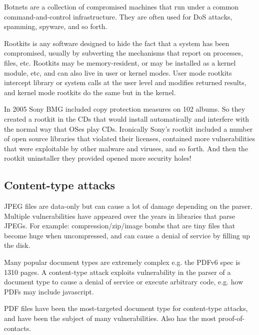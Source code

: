 \documentclass[../notes.tex]{subfiles}
\begin{document}
\begin{definition}
Botnets are a collection of compromised machines that run under a common command-and-control infrastructure.
 They are often used for DoS attacks, spamming, spyware, and so forth.
\end{definition}



\begin{definition}
    Rootkits is any software designed to hide the fact that a system has been compromised, usually by subverting the mechanisms that report on processes, files, etc.
    Rootkits may be memory-resident, or may be installed as a kernel module, etc, and can also live in user or kernel modes.
    User mode rootkits intercept library or system calls at the user level and modifies returned results, and kernel mode rootkits do the same but in the kernel.
\end{definition}


In 2005 Sony BMG included copy protection measures on 102 albums. So they created a rootkit in the CDs that would install automatically and interfere with the normal way that OSes play CDs.
Ironically Sony's rootkit included a number of open source libraries that violated their licenses, contained more vulnerabilities that were exploitable by other malware and viruses, and so forth.
And then the rootkit uninstaller they provided opened more security holes!



\subsection{Content-type attacks}

JPEG files are data-only but can cause a lot of damage depending on the parser.
Multiple vulnerabilities have appeared over the years in libraries that parse JPEGs.
For example: compression/zip/image bombs that are tiny files that become huge when uncompressed, and can cause a denial of service by filling up the disk.

Many popular document types are extremely complex e.g. the PDFv6 spec is 1310 pages.
A content-type attack exploits vulnerability in the parser of a document type to cause a denial of service or execute arbitrary code, e.g. how PDFs may include javascript.

PDF files have been the most-targeted document type for content-type attacks, and have been the subject of many vulnerabilities. Also has the most proof-of-contacts.
\end{document}
